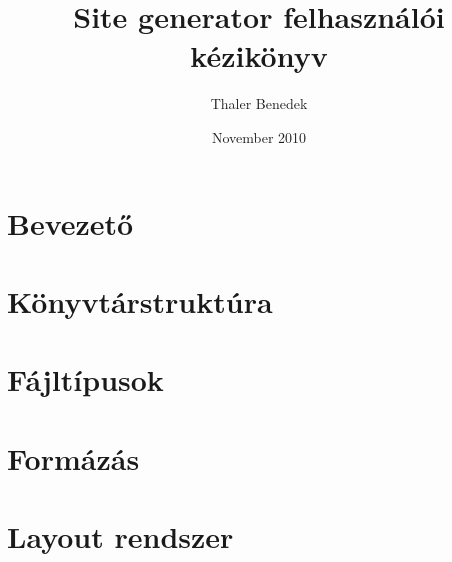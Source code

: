 \documentclass[a4paper,10pt]{article}
\title{Site generator felhasználói kézikönyv}
\author{Thaler Benedek}
\date{November 2010}
\begin{document}
\maketitle
\tableofcontents

\section{Bevezető}
\section{Könyvtárstruktúra}
\section{Fájltípusok} %
\section{Formázás}
\section{Layout rendszer}
\end{document}
